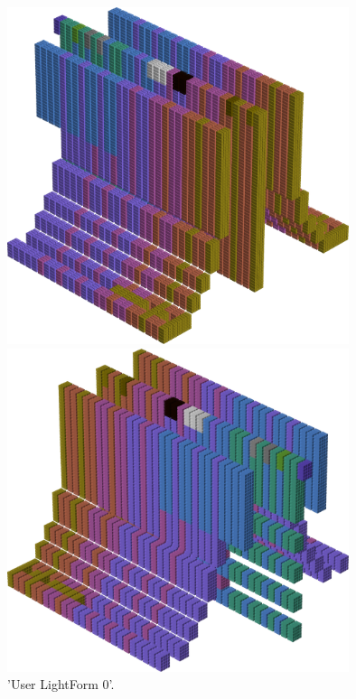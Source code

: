 %
\begin{minipage}[b]{0.48\linewidth}
\begin{figure}[H]
    \centering
    \begin{adjustbox}{width=4cm,margin=0cm 0cm}
      \includegraphics[width=10cm]{src/colorspace_patterns/pattern8-45.png}%
    \end{adjustbox}
    \begin{adjustbox}{width=4cm,margin=0cm 0cm}
      \includegraphics[width=10cm]{src/colorspace_patterns/pattern8-225.png}%
    \end{adjustbox}
\caption{'User LightForm 0'.}
\end{figure}
\end{minipage}
